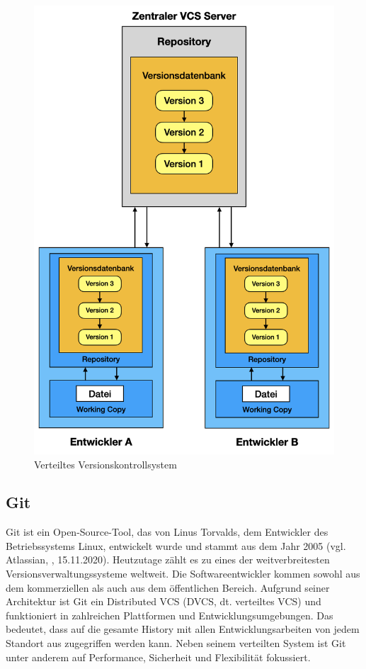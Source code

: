 \begin{itemize}
	\begin{figure}[H]
	\begin{center}
		\includegraphics[scale=.6]{images/distributed_vcs.png}
	\end{center}
		\caption{Verteiltes Versionskontrollsystem}
	\end{figure}
\end{itemize}

\subsection{Git}
Git ist ein Open-Source-Tool, das von Linus Torvalds, dem Entwickler des Betriebssystems Linux, entwickelt wurde und stammt aus dem Jahr 2005 (vgl. Atlassian, \cite{atlassian_git_2020}, 15.11.2020). Heutzutage zählt es zu eines der weitverbreitesten Versionsverwaltungssysteme weltweit. Die Softwareentwickler kommen sowohl aus dem kommerziellen als auch aus dem öffentlichen Bereich. Aufgrund seiner Architektur ist Git ein Distributed VCS (DVCS, dt. verteiltes VCS) und funktioniert in zahlreichen Plattformen und Entwicklungsumgebungen. Das bedeutet, dass auf die gesamte History mit allen Entwicklungsarbeiten von jedem Standort aus zugegriffen werden kann. Neben seinem verteilten System ist Git unter anderem auf Performance, Sicherheit und Flexibilität fokussiert.

